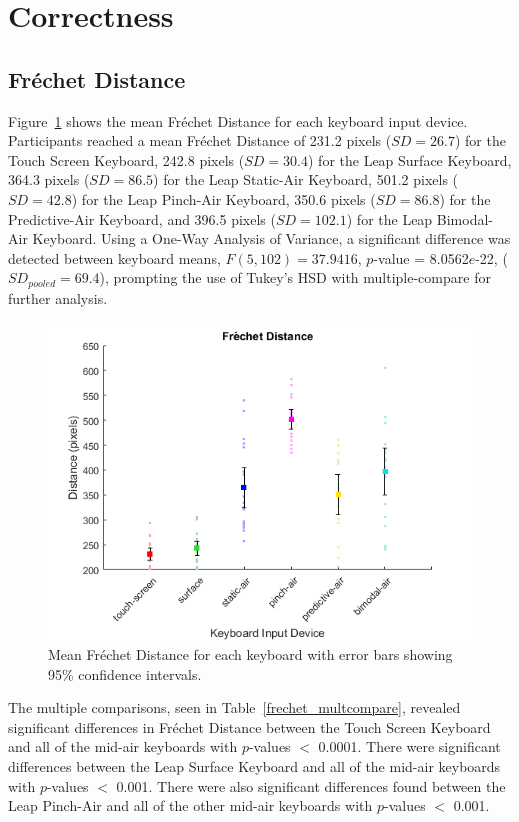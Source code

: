 \section{Correctness}

\subsection{Fr\'echet Distance} \label{results_frechet}
Figure~\ref{fig_frechet_mean} shows the mean Fr\'echet Distance for each keyboard input device. Participants reached a mean Fr\'echet Distance of 231.2 pixels ($SD = 26.7$) for the Touch Screen Keyboard, 242.8 pixels ($SD = 30.4$) for the Leap Surface Keyboard, 364.3 pixels ($SD = 86.5$) for the Leap Static-Air Keyboard, 501.2 pixels ($SD = 42.8$) for the Leap Pinch-Air Keyboard, 350.6 pixels ($SD = 86.8$) for the Predictive-Air Keyboard, and 396.5 pixels ($SD = 102.1$) for the Leap Bimodal-Air Keyboard. Using a One-Way Analysis of Variance, a significant difference was detected between keyboard means, $F(5, 102) = 37.9416$, $p$-value = 8.0562$e$-22, ($SD_{pooled} = 69.4$), prompting the use of Tukey's HSD with multiple-compare for further analysis.

\begin{figure}[h]
	\centering
	\includegraphics{fig_frechet_mean}
	\caption[Mean Fr\'echet Distance]{Mean Fr\'echet Distance for each keyboard with error bars showing 95\% confidence intervals.}
	\label{fig_frechet_mean}
\end{figure}

The multiple comparisons, seen in Table~\ref{frechet_multcompare}, revealed significant differences in Fr\'echet Distance between the Touch Screen Keyboard and all of the mid-air keyboards with $p$-values $<$ 0.0001. There were significant differences between the Leap Surface Keyboard and all of the mid-air keyboards with $p$-values $<$ 0.001. There were also significant differences found between the Leap Pinch-Air and all of the other mid-air keyboards with $p$-values $<$ 0.001.

